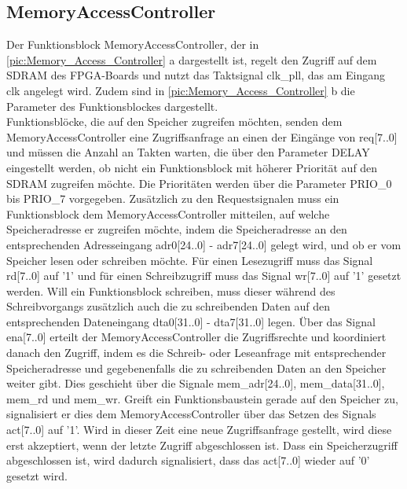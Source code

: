 \documentclass[ngerman,12pt]{article} %
\begin{document}
{\subsection{MemoryAccessController}
\label{sec:MemoryAccessController}
Der Funktionsblock MemoryAccessController, der in \autoref{pic:Memory_Access_Controller} a dargestellt ist, regelt den Zugriff auf dem SDRAM des FPGA-Boards und nutzt das Taktsignal clk\_pll, das am Eingang clk angelegt wird. Zudem sind in \autoref{pic:Memory_Access_Controller} b die Parameter des Funktionsblockes dargestellt.\\
Funktionsblöcke, die auf den Speicher zugreifen möchten, senden dem MemoryAccessController eine Zugriffsanfrage an einen der Eingänge von req[7..0] und müssen die Anzahl an Takten warten, die über den Parameter DELAY eingestellt werden, ob nicht ein Funktionsblock mit höherer Priorität auf den SDRAM zugreifen möchte. Die Prioritäten werden über die Parameter PRIO\_0 bis PRIO\_7 vorgegeben. Zusätzlich zu den Requestsignalen muss ein Funktionsblock dem MemoryAccessController mitteilen, auf welche Speicheradresse er zugreifen möchte, indem die Speicheradresse an den entsprechenden Adresseingang adr0[24..0] - adr7[24..0] gelegt wird, und ob er vom Speicher lesen oder schreiben möchte. Für einen Lesezugriff muss das Signal rd[7..0] auf '1' und für einen Schreibzugriff muss das Signal wr[7..0] auf '1' gesetzt werden. Will ein Funktionsblock schreiben, muss dieser während des Schreibvorgangs zusätzlich auch die zu schreibenden Daten auf den entsprechenden Dateneingang dta0[31..0] - dta7[31..0] legen. Über das Signal ena[7..0] erteilt der MemoryAccessController die Zugriffsrechte und koordiniert danach den Zugriff, indem es die Schreib- oder Leseanfrage mit entsprechender Speicheradresse und gegebenenfalls die zu schreibenden Daten an den Speicher weiter gibt. Dies geschieht über die Signale mem\_adr[24..0], mem\_data[31..0], mem\_rd und mem\_wr. Greift ein Funktionsbaustein gerade auf den Speicher zu, signalisiert er dies dem MemoryAccessController über das Setzen des Signals act[7..0] auf '1'. Wird in dieser Zeit eine neue Zugriffsanfrage gestellt, wird diese erst akzeptiert, wenn der letzte Zugriff abgeschlossen ist. Dass ein Speicherzugriff abgeschlossen ist, wird dadurch signalisiert, dass das act[7..0] wieder auf '0' gesetzt wird.

}
\end{document}
